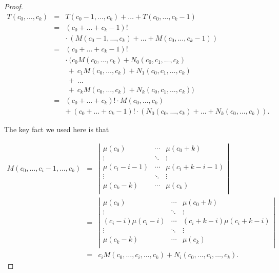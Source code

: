 \documentclass[12pt]{amsart}
\newcommand{\ifact}{\mu}
\newcommand{\M}{M}
\newcommand{\N}{N}
\begin{document}
\begin{proof}
$$\begin{array}{ccl}
T(c_0, \dots, c_k) & = & T(c_0-1, \dots, c_k) + \dots + T(c_0, \dots, c_k-1) \\
& = & (c_0 + \dots + c_k-1)! \\
& & \cdot\ ( \M(c_0-1, \dots, c_k) + \dots + \M(c_0, \dots, c_k-1)) \\
& = & (c_0 + \dots + c_k-1)! \\
& & \cdot\ ( c_0 \M(c_0, \dots, c_k) + \N_0(c_0, c_1, \dots, c_k) \\
& & \ +\ c_1 \M(c_0, \dots, c_k) + \N_1(c_0, c_1, \dots, c_k) \\
& & \ +\ \dots \\
& & \ +\ c_k \M(c_0, \dots, c_k) + \N_k(c_0, c_1, \dots, c_k) ) \\
& = & (c_0 + \dots + c_k)! \cdot \M(c_0,\dots,c_k) \\
& & +\ (c_0+\dots+c_k-1)! \cdot (\N_0(c_0,\dots,c_k) + \dots + \N_k(c_0,\dots,c_k)).
\end{array}$$

The key fact we used here is that

$$\begin{array}{ccl}
\M(c_0, \dots, c_i - 1, \dots, c_k) & = & \left|
\begin{matrix}
\ifact(c_0) & \cdots & \ifact(c_0+k) \\
\vdots & \ddots & \vdots \\
\ifact(c_i-i-1) & \cdots & \ifact(c_i+k-i-1) \\
\vdots & \ddots & \vdots \\
\ifact(c_k-k) & \cdots & \ifact(c_k) \\
\end{matrix} \right| \\
& = & \left|
\begin{matrix}
\ifact(c_0) & \cdots & \ifact(c_0+k) \\
\vdots & \ddots & \vdots \\
(c_i - i) \ifact(c_i-i) & \cdots & (c_i+k-i) \ifact(c_i+k-i) \\
\vdots & \ddots & \vdots \\
\ifact(c_k-k) & \cdots & \ifact(c_k) \\
\end{matrix} \right| \\
& = & c_i \M(c_0, \dots, c_i, \dots, c_k) + \N_i(c_0, \dots, c_i, \dots, c_k).
\end{array}$$


\end{proof}
\end{document}
